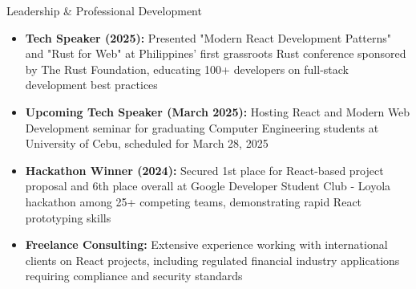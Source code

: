 \documentclass[]{mcdowellcv}
\begin{document}
	\begin{cvsection}{Leadership \& Professional Development}
		\begin{cvsubsection}{}{}{}	
			\begin{itemize}
				\item \textbf{Tech Speaker (2025):} Presented "Modern React Development Patterns" and "Rust for Web" at Philippines' first grassroots Rust conference sponsored by The Rust Foundation, educating 100+ developers on full-stack development best practices
				\item \textbf{Upcoming Tech Speaker (March 2025): } Hosting React and Modern Web Development seminar for graduating Computer Engineering students at University of Cebu, scheduled for March 28, 2025
				\item \textbf{Hackathon Winner (2024): } Secured 1st place for React-based project proposal and 6th place overall at Google Developer Student Club - Loyola hackathon among 25+ competing teams, demonstrating rapid React prototyping skills
				\item \textbf{Freelance Consulting:} Extensive experience working with international clients on React projects, including regulated financial industry applications requiring compliance and security standards
			\end{itemize}
		\end{cvsubsection}
	\end{cvsection}
	
\end{document}
